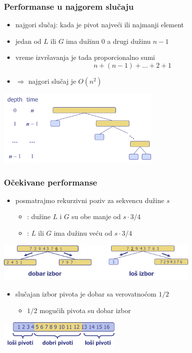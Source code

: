 \documentclass[compress,aspectratio=169]{beamer}
\begin{document}
\begin{frame}[fragile]
  \frametitle{Performanse u najgorem slučaju}
  \begin{itemize}
    \item najgori slučaj: kada je pivot najveći ili najmanji element
    \item jedan od $L$ ili $G$ ima dužinu 0 a drugi dužinu $n-1$
    \item vreme izvršavanja je tada proporcionalno sumi
    $$ n + (n-1) + \ldots + 2 + 1$$
    \item $\Rightarrow$ najgori slučaj je $O(n^2)$
  \end{itemize}
  \begin{center}
    \includegraphics[width=8cm]{asp-12-pic23.png}
  \end{center}
\end{frame}

\begin{frame}[fragile]
  \frametitle{Očekivane performanse}
  \begin{itemize}
    \item posmatrajmo rekurzivni poziv za sekvencu dužine $s$
    \begin{itemize}
      \item {}: dužine $L$ i $G$ su obe manje od $s\cdot 3/4$
      \item {}: $L$ ili $G$ ima dužinu veću od $s\cdot 3/4$
    \end{itemize}
  \end{itemize}
  \begin{center}
    \includegraphics[width=10cm]{asp-12-pic24.png}
  \end{center}
  \begin{itemize}
    \item slučajan izbor pivota je dobar sa verovatnoćom $1/2$
    \begin{itemize}
      \item $1/2$ mogućih pivota su dobar izbor
    \end{itemize}
  \end{itemize}
  \begin{center}
    \includegraphics[width=6cm]{asp-12-pic25.png}
  \end{center}
\end{frame}
\end{document}
